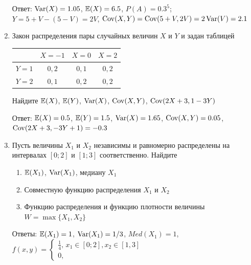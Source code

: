 \documentclass[12pt, a4paper]{article}\usepackage[]{graphicx}\usepackage[]{color}
\begin{document}
\begin{enumerate}
		Ответ: $\operatorname{Var}(X)=1.05$, $\mathbb{E}(X)=6.5$, $P(A)=0.3^5$; $Y=5+V-(5-V)=2V$, $\operatorname{Cov}(X,Y)=\operatorname{Cov}(5+V,2V)=2\operatorname{Var}(V)=2.1$

		\item Закон распределения пары случайных величин $X$ и $Y$  и  задан таблицей

		\begin{tabular}{c|ccc}
			& $X=-1$ & $X=0$ & $X=2$ \\
			\hline
			$Y=1$ & $0{,}2$ & $0{,}1$ & $0{,}2$ \\
			$Y=2$ & $0{,}1$ & $0{,}2$ & $0{,}2$ \\
		\end{tabular}


		Найдите $\mathbb{E}(X)$, $\mathbb{E}(Y)$, $\operatorname{Var}(X)$, $\operatorname{Cov}(X,Y)$, $\operatorname{Cov}(2X+3,1-3Y)$

		Ответ: $\mathbb{E}(X)=0.5$, $\mathbb{E}(Y)=1.5$, $\operatorname{Var}(X)=1.65$, $\operatorname{Cov}(X,Y)=0.05$, $\operatorname{Cov}(2X+3,-3Y+1)=-0.3$

		\item Пусть величины $X_1$ и $X_2$ независимы и равномерно распределены на интервалах $[0;2]$ и $[1;3]$ соответственно. Найдите
		\begin{enumerate}
			\item $\mathbb{E}(X_1)$, $\operatorname{Var}(X_1)$, медиану $X_1$
			\item Совместную функцию распределения $X_1$ и $X_2$
			\item Функцию распределения и функцию плотности величины $W=\max\{X_1,X_2\}$
		\end{enumerate}

		Ответы: $\mathbb{E}(X_1)=1$, $\operatorname{Var}(X_1)=1/3$, $Med(X_1)=1$, $f(x,y)=\begin{cases}
		\frac{1}{4}, \, x_1\in [0;2], x_2\in [1,3] \\
		0,
		\end{cases}$
	\end{enumerate}
\end{document}
